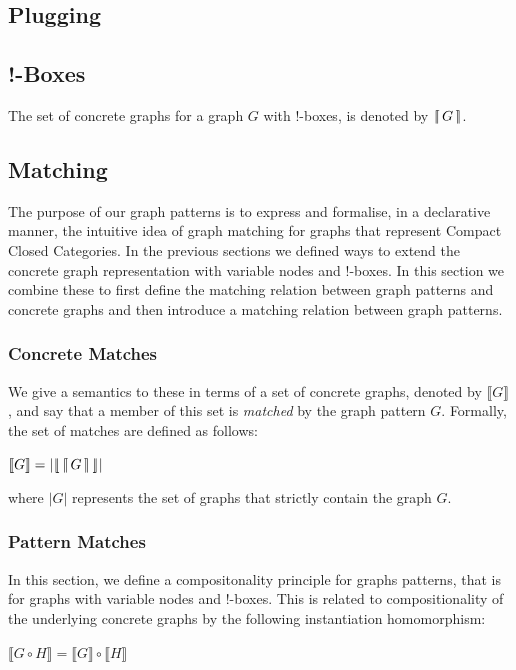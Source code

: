\documentclass[runningheads]{llncs}
\newcommand{\vinterp}[1]{\lfloor\hspace{-0.27em}|\, #1\, |\hspace{-0.27em}\rfloor}
\newcommand{\binterp}[1]{\lceil\hspace{-0.27em}|\, #1\, |\hspace{-0.27em}\rceil}
\newcommand{\minterp}[1]{\llbracket #1 \rrbracket}
\newcommand{\sinterp}[1]{| #1 |}
\begin{document}
\subsection{Plugging}



\subsection{!-Boxes}

The set of concrete graphs for a graph $G$ with !-boxes, is denoted by
$\binterp{G}$.

\subsection{Matching}

The purpose of our graph patterns is to express and formalise, in a
declarative manner, the intuitive idea of graph matching for graphs
that represent Compact Closed Categories. In the previous sections we
defined ways to extend the concrete graph representation with variable
nodes and !-boxes. In this section we combine these to first define
the matching relation between graph patterns and concrete graphs and
then introduce a matching relation between graph patterns.

\subsubsection{Concrete Matches}

We give a semantics to these in terms of a set of concrete graphs,
denoted by $\minterp{G}$, and say that a member of this set is
\emph{matched} by the graph pattern $G$. Formally, the set of matches
are defined as follows:

$\minterp{G} = \sinterp{\vinterp{\binterp{G}}}$

where $\sinterp{G}$ represents the set of graphs that strictly contain
the graph $G$.

\subsubsection{Pattern Matches}


In this section, we define a compositonality principle for graphs
patterns, that is for graphs with variable nodes and !-boxes. This is
related to compositionality of the underlying concrete graphs by the
following instantiation homomorphism:

$\llbracket G \circ H \rrbracket = \llbracket G \rrbracket \circ \llbracket H \rrbracket$
\end{document}
